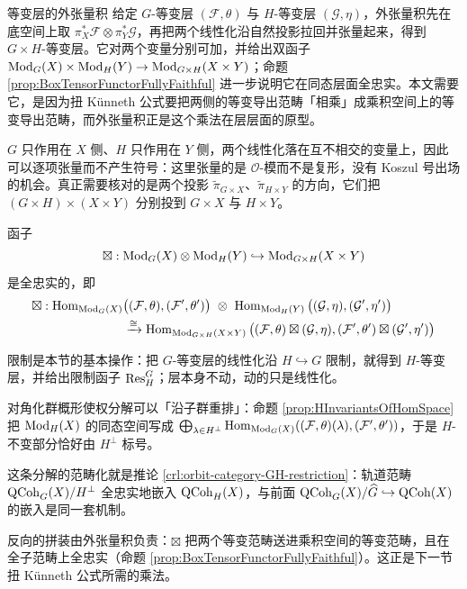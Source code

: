 \begin{conceptbox}{等变层的外张量积}
给定 $G$-等变层 $(\mathcal{F},\theta)$ 与 $H$-等变层 $(\mathcal{G},\eta)$，外张量积先在底空间上取 $\pi_X^*\mathcal{F}\otimes\pi_Y^*\mathcal{G}$，再把两个线性化沿自然投影拉回并张量起来，得到 $G\times H$-等变层。它对两个变量分别可加，并给出双函子 $\operatorname{\mathrm{Mod}}_G(X)\times\operatorname{\mathrm{Mod}}_H(Y)\to\operatorname{\mathrm{Mod}}_{G\times H}(X\times Y)$；命题 \ref{prop:BoxTensorFunctorFullyFaithful} 进一步说明它在同态层面全忠实。本文需要它，是因为扭 Künneth 公式要把两侧的等变导出范畴「相乘」成乘积空间上的等变导出范畴，而外张量积正是这个乘法在层层面的原型。
\par\smallskip{}
\end{conceptbox}

\begin{yizhu}[外张量积为什么不必担心符号]
$G$ 只作用在 $X$ 侧、$H$ 只作用在 $Y$ 侧，两个线性化落在互不相交的变量上，因此可以逐项张量而不产生符号：这里张量的是 $\mathcal{O}$-模而不是复形，没有 Koszul 号出场的机会。真正需要核对的是两个投影 $\tilde{\pi}_{G\times X}$、$\tilde{\pi}_{H\times Y}$ 的方向，它们把 $(G\times H)\times(X\times Y)$ 分别投到 $G\times X$ 与 $H\times Y$。
\end{yizhu}

\begin{prop}\label{prop:BoxTensorFunctorFullyFaithful}
函子
$$
\boxtimes:
\operatorname{\mathrm{Mod}}_G(X)\otimes\operatorname{\mathrm{Mod}}_H(Y)
\hookrightarrow
\operatorname{\mathrm{Mod}}_{G\times H}(X\times Y)
$$
是全忠实的，即
\begin{align*}
\boxtimes:
\operatorname{\operatorname{Hom}}_{\operatorname{\mathrm{Mod}}_G(X)}&
\big(
(\mathcal{F},\theta),
(\mathcal{F}',\theta')
\big)
\
\otimes
\
\operatorname{\operatorname{Hom}}_{\operatorname{\mathrm{Mod}}_H(Y)}
\big(
(\mathcal{G},\eta),
(\mathcal{G}',\eta')
\big)
\\ 
&\xrightarrow{\cong}
\operatorname{\operatorname{Hom}}_{\operatorname{\mathrm{Mod}}_{G\times H}(X\times Y)}
\big(
(\mathcal{F},\theta)\boxtimes(\mathcal{G},\eta),
(\mathcal{F}',\theta')\boxtimes(\mathcal{G}',\eta')
\big)
\end{align*}
\end{prop}

\begin{keytakeaways}
  \item 限制是本节的基本操作：把 $G$-等变层的线性化沿 $H\hookrightarrow G$ 限制，就得到 $H$-等变层，并给出限制函子 $\operatorname{\mathrm{Res}}_H^G$；层本身不动，动的只是线性化。
  \item 对角化群概形使权分解可以「沿子群重排」：命题 \ref{prop:HInvariantsOfHomSpace} 把 $\operatorname{\mathrm{Mod}}_H(X)$ 的同态空间写成 $\bigoplus_{\operatorname{\lambda}\in H^\perp}\operatorname{Hom}_{\operatorname{\mathrm{Mod}}_G(X)}((\mathcal{F},\theta)(\operatorname{\lambda}),(\mathcal{F}',\theta'))$，于是 $H$-不变部分恰好由 $H^\perp$ 标号。
  \item 这条分解的范畴化就是推论 \ref{crl:orbit-category-GH-restriction}：轨道范畴 $\operatorname{\mathrm{QCoh}}_G(X)/H^\perp$ 全忠实地嵌入 $\operatorname{\mathrm{QCoh}}_H(X)$，与前面 $\operatorname{\mathrm{QCoh}}_G(X)/\widehat{G}\hookrightarrow\operatorname{\mathrm{QCoh}}(X)$ 的嵌入是同一套机制。
  \item 反向的拼装由外张量积负责：$\boxtimes$ 把两个等变范畴送进乘积空间的等变范畴，且在全子范畴上全忠实（命题 \ref{prop:BoxTensorFunctorFullyFaithful}）。这正是下一节扭 Künneth 公式所需的乘法。
\end{keytakeaways}
